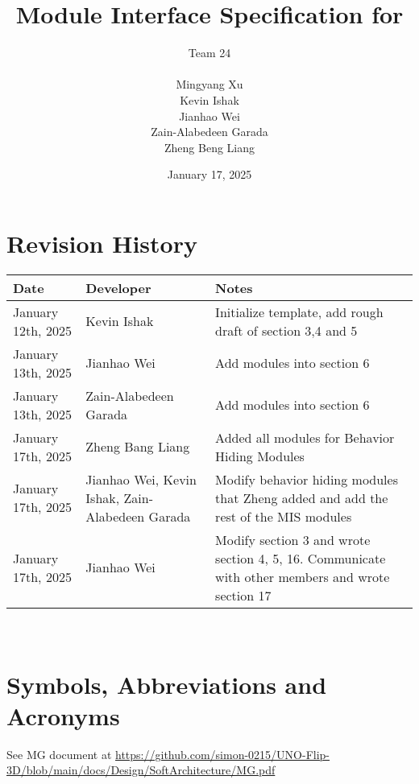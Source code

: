 \documentclass[12pt, titlepage]{article}
\begin{document}
\title{Module Interface Specification for }

\author{\authname Team 24 \\ \\ Mingyang Xu \\ Kevin Ishak \\ Jianhao Wei \\ Zain-Alabedeen Garada \\ Zheng Beng Liang}

\date{January 17, 2025}

\maketitle


\section{Revision History}

\begin{tabularx}{\textwidth}{p{4cm}p{3cm}X}
\toprule {\bf Date} & {\bf Developer} & {\bf Notes}\\
\midrule
January 12th, 2025 & Kevin Ishak & Initialize template, add rough draft of section 3,4 and 5\\
January 13th, 2025 & Jianhao Wei & Add modules into section 6\\
January 13th, 2025 & Zain-Alabedeen Garada & Add modules into section 6\\
January 17th, 2025 & Zheng Bang Liang & Added all modules for Behavior Hiding Modules\\
January 17th, 2025 & Jianhao Wei, Kevin Ishak, Zain-Alabedeen Garada & Modify behavior hiding modules that Zheng added and add the rest of the MIS modules \\
January 17th, 2025 & Jianhao Wei & Modify section 3 and wrote section 4, 5, 16. Communicate with other members and wrote section 17\\
\bottomrule
\end{tabularx}

~\newpage

\section{Symbols, Abbreviations and Acronyms}

See MG document at \url{https://github.com/simon-0215/UNO-Flip-3D/blob/main/docs/Design/SoftArchitecture/MG.pdf}
\end{document}
